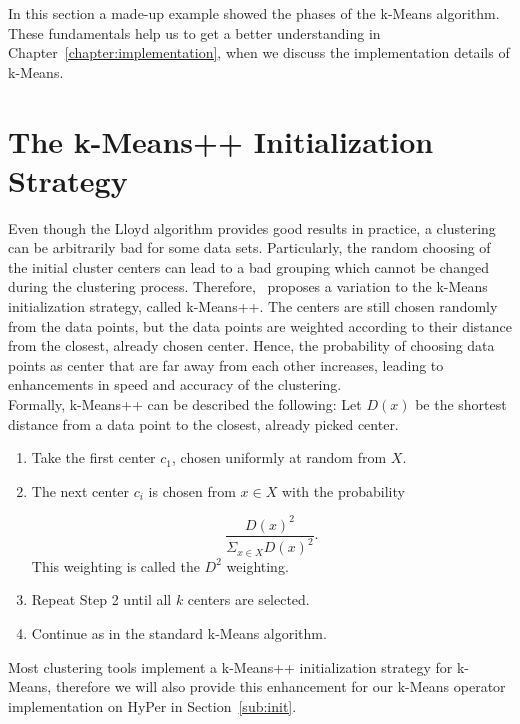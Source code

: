 In this section a made-up example showed the phases of the k-Means algorithm. These fundamentals help us to get a better understanding in Chapter~\ref{chapter:implementation}, when we discuss the implementation details of k-Means.



\section{The k-Means++ Initialization Strategy}\label{section:kmeans_init}

Even though the Lloyd algorithm provides good results in practice, a clustering can be arbitrarily bad for some data sets. Particularly, the random choosing of the initial cluster centers can lead to a bad grouping which cannot be changed during the clustering process. Therefore,~\cite{kmeans++} proposes a variation to the k-Means initialization strategy, called k-Means++. The centers are still chosen randomly from the data points, but the data points are weighted according to their distance from the closest, already chosen center. Hence, the probability of choosing data points as center that are far away from each other increases, leading to enhancements in speed and accuracy of the clustering.
\\
Formally, k-Means++ can be described the following:
Let $D(x)$ be the shortest distance from a data point to the closest, already picked center.

\begin{enumerate} 
\item Take the first center $c_1$, chosen uniformly at random from $X$.
\item The next center $c_i$ is chosen from $x \in X$ with the probability 

\begin{equation*}
\frac {D(x)^2} {\Sigma_{x \in X} D(x)^2}.
\end{equation*}
This weighting is called the $D^2$ weighting.

\item Repeat Step 2 until all $k$ centers are selected.
\item Continue as in the standard k-Means algorithm.
\end{enumerate}

Most clustering tools implement a k-Means++ initialization strategy for k-Means, therefore we will also provide this enhancement for our k-Means operator implementation on HyPer in Section~\ref{sub:init}.

